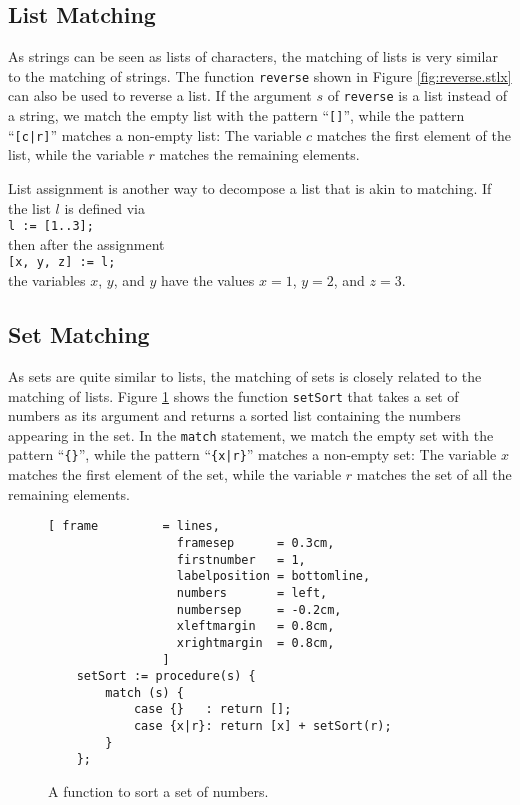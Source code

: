 \subsection{List Matching}
As strings can be seen as lists of characters, the matching of lists is very similar to the matching of
strings.  The function \texttt{reverse} shown in Figure \ref{fig:reverse.stlx} can also be used to
reverse a list.
 If the argument $s$ of \texttt{reverse} is a list instead of a string, we match the empty list with
 the pattern ``\texttt{[]}'', while the pattern ``\texttt{[c|r]}'' matches a non-empty list:  
The variable $c$  matches the first element  of the list, while the variable $r$ matches the remaining elements.

List assignment is another way to decompose a list that is akin to matching.  If the list 
$l$ is defined via
\\[0.2cm]
\hspace*{1.3cm}
\texttt{l := [1..3];}
\\[0.2cm]
then after the assignment
\\[0.2cm]
\hspace*{1.3cm}
\texttt{[x, y, z] := l;}
\\[0.2cm]
the variables $x$, $y$, and $y$ have the values $x = 1$, $y = 2$, and $z = 3$.

\subsection{Set Matching}
As sets are quite similar to lists, the matching of sets is closely related to the matching of
lists.  Figure \ref{fig:set-sort.stlx}  shows the function \texttt{setSort} that takes a
set of numbers as its  argument and returns a sorted list containing the numbers appearing
in the set.  In the \texttt{match} statement, we match the empty set with the pattern
``\texttt{\{\}}'', while the pattern ``\texttt{\{x|r\}}'' matches a non-empty set:  
The variable $x$ matches the first element of the set, while the variable $r$ matches the
set of all the remaining elements.  


\begin{figure}[!ht]
\centering
\begin{Verbatim}[ frame         = lines, 
                  framesep      = 0.3cm, 
                  firstnumber   = 1,
                  labelposition = bottomline,
                  numbers       = left,
                  numbersep     = -0.2cm,
                  xleftmargin   = 0.8cm,
                  xrightmargin  = 0.8cm,
                ]
    setSort := procedure(s) {
        match (s) {
            case {}   : return [];
            case {x|r}: return [x] + setSort(r);
        }
    };
\end{Verbatim}
\vspace*{-0.3cm}
\caption{A function to sort a set of numbers.}
\label{fig:set-sort.stlx}
\end{figure}

